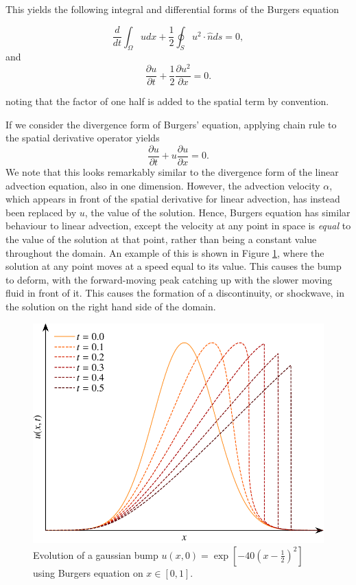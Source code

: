 This yields the following integral and differential forms of the Burgers equation
\begin{eqBox}
\begin{equation}
	 \frac{d}{dt}\int_\Omega u dx + \frac{1}{2}\oint_S u^2 \cdot \hat{n} ds =  0,
\end{equation}
and
\begin{equation}
	\frac{\partial u}{\partial t} +  \frac{1}{2} \frac{\partial u^2}{\partial x} = 0.
\end{equation}
\end{eqBox}
noting that the factor of one half is added to the spatial term by convention.

If we consider the divergence form of Burgers' equation, applying chain rule to the spatial derivative operator yields
\begin{equation}
	\frac{\partial u}{\partial t} +  u \frac{\partial u}{\partial x} = 0.
\end{equation}
We note that this looks remarkably similar to the divergence form of the linear advection equation, also in one dimension. However, the advection velocity $\alpha$, which appears in front of the spatial derivative for linear advection, has instead been replaced by $u$, the value of the solution. Hence, Burgers equation has similar behaviour to linear advection, except the velocity at any point in space is {\it equal} to the value of the solution at that point, rather than being a constant value throughout the domain. An example of this is shown in Figure \ref{fig:burgers_equation}, where the solution at any point moves at a speed equal to its value. This causes the bump to deform, with the forward-moving peak catching up with the slower moving fluid in front of it. This causes the formation of a discontinuity, or shockwave, in the solution on the right hand side of the domain.
\begin{figure}[htbp]
	\centering
	\includegraphics[width=0.65\linewidth]{Pictures/burgers_equation}
	\caption{Evolution of a gaussian bump $u(x,0)=\exp\left[-40\left(x-\frac{1}{2}\right)^2\right]$ using Burgers equation on $x\in[0,1]$.}
	\label{fig:burgers_equation}
\end{figure}
